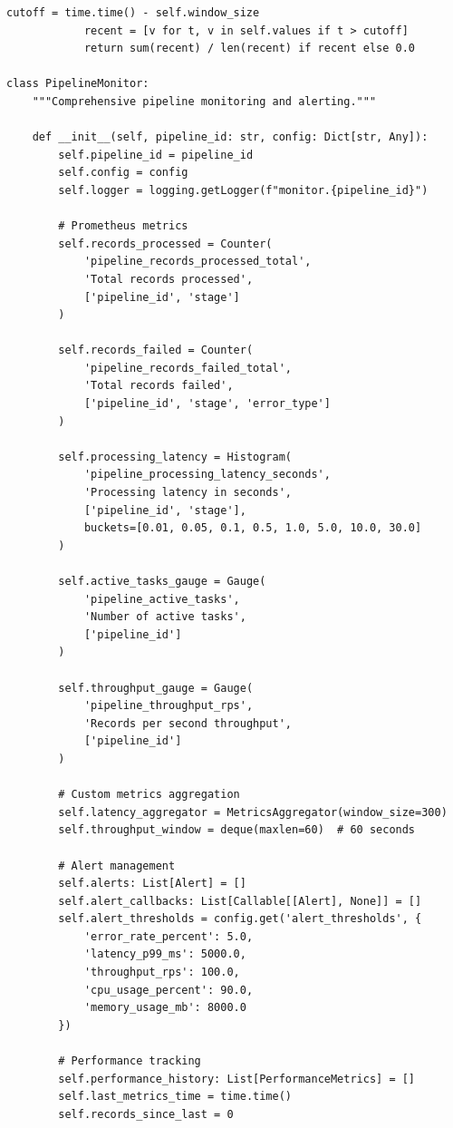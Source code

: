 \begin{lstlisting}[style=python, caption=PipelineMonitor with Performance Tracking]
            cutoff = time.time() - self.window_size
            recent = [v for t, v in self.values if t > cutoff]
            return sum(recent) / len(recent) if recent else 0.0

class PipelineMonitor:
    """Comprehensive pipeline monitoring and alerting."""

    def __init__(self, pipeline_id: str, config: Dict[str, Any]):
        self.pipeline_id = pipeline_id
        self.config = config
        self.logger = logging.getLogger(f"monitor.{pipeline_id}")

        # Prometheus metrics
        self.records_processed = Counter(
            'pipeline_records_processed_total',
            'Total records processed',
            ['pipeline_id', 'stage']
        )

        self.records_failed = Counter(
            'pipeline_records_failed_total',
            'Total records failed',
            ['pipeline_id', 'stage', 'error_type']
        )

        self.processing_latency = Histogram(
            'pipeline_processing_latency_seconds',
            'Processing latency in seconds',
            ['pipeline_id', 'stage'],
            buckets=[0.01, 0.05, 0.1, 0.5, 1.0, 5.0, 10.0, 30.0]
        )

        self.active_tasks_gauge = Gauge(
            'pipeline_active_tasks',
            'Number of active tasks',
            ['pipeline_id']
        )

        self.throughput_gauge = Gauge(
            'pipeline_throughput_rps',
            'Records per second throughput',
            ['pipeline_id']
        )

        # Custom metrics aggregation
        self.latency_aggregator = MetricsAggregator(window_size=300)
        self.throughput_window = deque(maxlen=60)  # 60 seconds

        # Alert management
        self.alerts: List[Alert] = []
        self.alert_callbacks: List[Callable[[Alert], None]] = []
        self.alert_thresholds = config.get('alert_thresholds', {
            'error_rate_percent': 5.0,
            'latency_p99_ms': 5000.0,
            'throughput_rps': 100.0,
            'cpu_usage_percent': 90.0,
            'memory_usage_mb': 8000.0
        })

        # Performance tracking
        self.performance_history: List[PerformanceMetrics] = []
        self.last_metrics_time = time.time()
        self.records_since_last = 0


\end{lstlisting}
